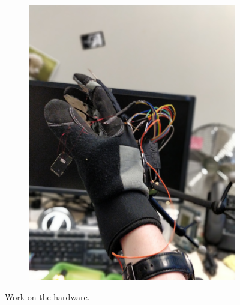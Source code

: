 \begin{figure}
\begin{subfigure}{.5\textwidth}
		\includegraphics[width=.8\linewidth]{./images/image5.jpg}
	\end{subfigure}
	\caption{Work on the hardware.}
	\label{fig:photoshardware}
\end{figure}


